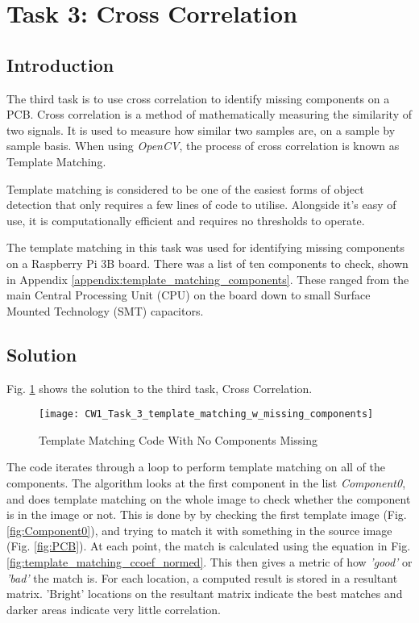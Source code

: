 \documentclass[conference]{IEEEtran}
\begin{document}
\section{Task 3: Cross Correlation} 

\subsection{Introduction}

The third task is to use cross correlation to identify missing components on a PCB. Cross correlation is a method of mathematically measuring the similarity of two signals. It is used to measure how similar two samples are, on a sample by sample basis. \cite{ref:what_is_cross_corrilation} When using \textit{OpenCV}, the process of cross correlation is known as Template Matching. \cite{ref:open_cv_templae_matching}

Template matching is considered to be one of the easiest forms of object detection that only requires a few lines of code to utilise. Alongside it's easy of use, it is computationally efficient and requires no thresholds to operate. \cite{ref:open_cv_templae_matching}

The template matching in this task was used for identifying missing components on a Raspberry Pi 3B board. There was a list of ten components to check, shown in Appendix \ref{appendix:template_matching_components}. These ranged from the main Central Processing Unit (CPU) on the board down to small Surface Mounted Technology (SMT) capacitors. 

\subsection{Solution}
Fig. \ref{fig:CW1_Task_3_template_matching_w_missing_components} shows the solution to the third task, Cross Correlation.

\begin{figure}[h]
\centerline{\texttt{[image: CW1\_Task\_3\_template\_matching\_w\_missing\_components]}}
\caption{Template Matching Code With No Components Missing}
\label{fig:CW1_Task_3_template_matching_w_missing_components}
\end{figure}

The code iterates through a loop to perform template matching on all of the components. The algorithm looks at the first component in the list \textit{Component0}, and does template matching on the whole image to check whether the component is in the image or not. This is done by by checking the first template image (Fig. \ref{fig:Component0}), and trying to match it with something in the source image (Fig. \ref{fig:PCB}). At each point, the match is calculated using the equation in Fig. \ref{fig:template_matching_ccoef_normed}. This then gives a metric of how \textit{'good'} or \textit{'bad'} the match is. For each location, a computed result is stored in a resultant matrix. 'Bright' locations on the resultant matrix indicate the best matches and darker areas indicate very little correlation. \cite{ref:open_cv_templae_matching}
\end{document}
